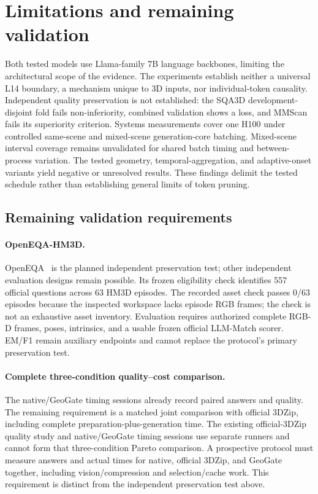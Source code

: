 \section{Limitations and remaining validation}
\label{sec:supp_limitations}

Both tested models use Llama-family 7B language backbones, limiting the architectural scope of the evidence. The experiments establish neither a universal L14 boundary, a mechanism unique to 3D inputs, nor individual-token causality. Independent quality preservation is not established: the SQA3D development-disjoint fold fails non-inferiority, combined validation shows a loss, and MMScan fails its superiority criterion. Systems measurements cover one H100 under controlled same-scene and mixed-scene generation-core batching. Mixed-scene interval coverage remains unvalidated for shared batch timing and between-process variation. The tested geometry, temporal-aggregation, and adaptive-onset variants yield negative or unresolved results. These findings delimit the tested schedule rather than establishing general limits of token pruning.

\subsection{Remaining validation requirements}
\label{sec:supp_pending}
\paragraph{OpenEQA-HM3D.} OpenEQA~\cite{majumdar2024openeqa} is the planned independent preservation test; other independent evaluation designs remain possible. Its frozen eligibility check identifies 557 official questions across 63 HM3D episodes. The recorded asset check passes 0/63 episodes because the inspected workspace lacks episode RGB frames; the check is not an exhaustive asset inventory. Evaluation requires authorized complete RGB-D frames, poses, intrinsics, and a usable frozen official LLM-Match scorer. EM/F1 remain auxiliary endpoints and cannot replace the protocol's primary preservation test.

\paragraph{Complete three-condition quality--cost comparison.} The native/GeoGate timing sessions already record paired answers and quality. The remaining requirement is a matched joint comparison with official 3DZip, including complete preparation-plus-generation time. The existing official-3DZip quality study and native/GeoGate timing sessions use separate runners and cannot form that three-condition Pareto comparison. A prospective protocol must measure answers and actual times for native, official 3DZip, and GeoGate together, including vision/compression and selection/cache work. This requirement is distinct from the independent preservation test above.
